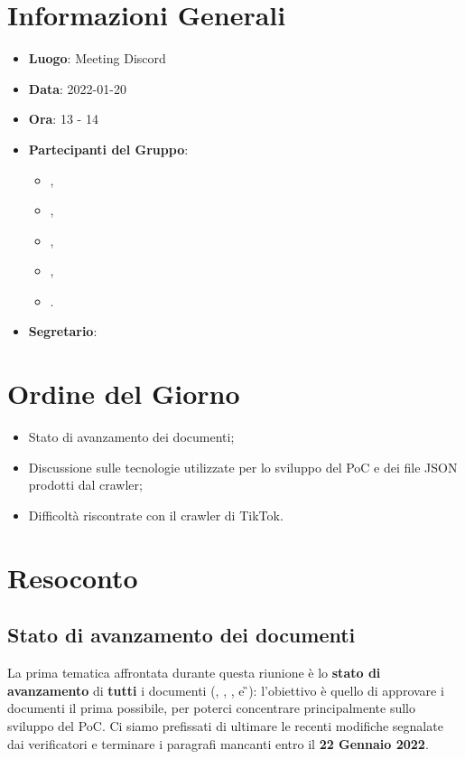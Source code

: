 \section{Informazioni Generali}

\begin{itemize}
\item{\textbf{Luogo}}: Meeting Discord
\item{\textbf{Data}}: 2022-01-20
\item{\textbf{Ora}}: 13 - 14
\item{\textbf{Partecipanti del Gruppo}}: 
	\begin{itemize}
	\item{\EP{},} 
	\item{\FP{},}
	\item{\GC{},}
	\item{\LW{},}
	\item{\MG{}.}
	\end{itemize} 
\item{\textbf{Segretario}}: \GC{}	
\end{itemize}

\section{Ordine del Giorno}
\begin{itemize}
\item{Stato di avanzamento dei documenti;}
\item{Discussione sulle tecnologie utilizzate per lo sviluppo del PoC e dei file JSON prodotti dal crawler;}
\item{Difficoltà riscontrate con il crawler di TikTok.}
\end{itemize}

\section{Resoconto}

\subsection{Stato di avanzamento dei documenti}

La prima tematica affrontata durante questa riunione è lo \textbf{stato di avanzamento} di \textbf{tutti} i documenti (\AdR{}, \NdP{}, \PdP{}, \PdQ{} e \G{}): l'obiettivo è quello di approvare i documenti il prima possibile, per poterci concentrare principalmente sullo sviluppo del PoC. Ci siamo prefissati di ultimare le recenti modifiche segnalate dai verificatori e terminare i paragrafi mancanti entro il \textbf{22 Gennaio 2022}.

